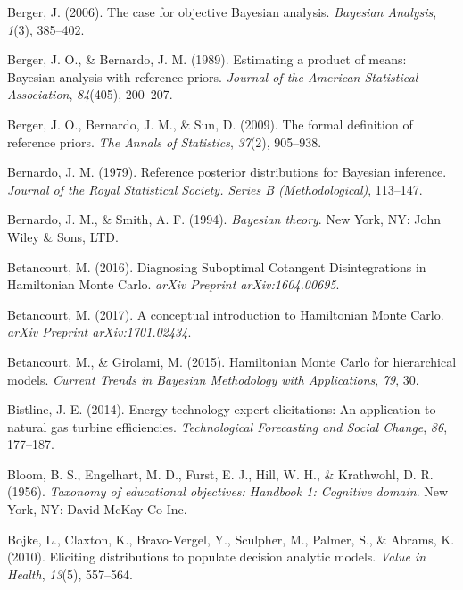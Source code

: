 \documentclass[openright,titlepage,12pt,a4paper]{book}
\begin{document}
\leavevmode\hypertarget{ref-berger_case_2006}{}%
Berger, J. (2006). The case for objective Bayesian analysis. \emph{Bayesian Analysis}, \emph{1}(3), 385--402.

\leavevmode\hypertarget{ref-berger_estimating_1989}{}%
Berger, J. O., \& Bernardo, J. M. (1989). Estimating a product of means: Bayesian analysis with reference priors. \emph{Journal of the American Statistical Association}, \emph{84}(405), 200--207.

\leavevmode\hypertarget{ref-berger_formal_2009}{}%
Berger, J. O., Bernardo, J. M., \& Sun, D. (2009). The formal definition of reference priors. \emph{The Annals of Statistics}, \emph{37}(2), 905--938.

\leavevmode\hypertarget{ref-bernardo_reference_1979}{}%
Bernardo, J. M. (1979). Reference posterior distributions for Bayesian inference. \emph{Journal of the Royal Statistical Society. Series B (Methodological)}, 113--147.

\leavevmode\hypertarget{ref-bernardo_bayesian_1994}{}%
Bernardo, J. M., \& Smith, A. F. (1994). \emph{Bayesian theory}. New York, NY: John Wiley \& Sons, LTD.

\leavevmode\hypertarget{ref-betancourt_diagnosing_2016}{}%
Betancourt, M. (2016). Diagnosing Suboptimal Cotangent Disintegrations in Hamiltonian Monte Carlo. \emph{arXiv Preprint arXiv:1604.00695}.

\leavevmode\hypertarget{ref-betancourt_conceptual_2017}{}%
Betancourt, M. (2017). A conceptual introduction to Hamiltonian Monte Carlo. \emph{arXiv Preprint arXiv:1701.02434}.

\leavevmode\hypertarget{ref-betancourt_hamiltonian_2015}{}%
Betancourt, M., \& Girolami, M. (2015). Hamiltonian Monte Carlo for hierarchical models. \emph{Current Trends in Bayesian Methodology with Applications}, \emph{79}, 30.

\leavevmode\hypertarget{ref-bistline_energy_2014}{}%
Bistline, J. E. (2014). Energy technology expert elicitations: An application to natural gas turbine efficiencies. \emph{Technological Forecasting and Social Change}, \emph{86}, 177--187.

\leavevmode\hypertarget{ref-bloom_taxonomy_1956}{}%
Bloom, B. S., Engelhart, M. D., Furst, E. J., Hill, W. H., \& Krathwohl, D. R. (1956). \emph{Taxonomy of educational objectives: Handbook 1: Cognitive domain}. New York, NY: David McKay Co Inc.

\leavevmode\hypertarget{ref-bojke_eliciting_2010}{}%
Bojke, L., Claxton, K., Bravo-Vergel, Y., Sculpher, M., Palmer, S., \& Abrams, K. (2010). Eliciting distributions to populate decision analytic models. \emph{Value in Health}, \emph{13}(5), 557--564.
\end{document}
